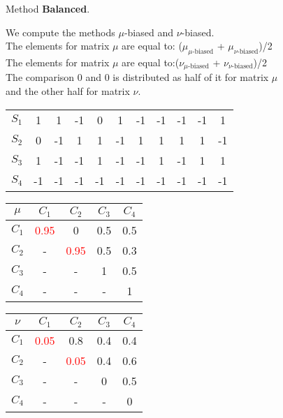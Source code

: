\documentclass{beamer}
\begin{document}
\begin{frame}
Method \textbf{Balanced}.

\bigskip
We compute the methods $\mu$-biased and $\nu$-biased.\\
The elements for matrix $\mu$ are equal to: ($\mu_{\text{$\mu$-biased}}$ + $\mu_{\text{$\nu$-biased}}$)/2\\
The elements for matrix $\mu$ are equal to:($\nu_{\text{$\mu$-biased}}$ + $\nu_{\text{$\nu$-biased}}$)/2\\
The comparison $0$ and $0$ is distributed as half of it for matrix $\mu$\\and the other half for matrix $\nu$.

\begin{center}
\begin{tabular}{c|cccccccccc}
& & & & & & & & & & \\
\hline $S_1$ & 1 & 1 & -1 & 0 & 1 & -1 & -1 & -1 & -1 & 1 \\
$S_2$ & 0 & -1 & 1 & 1 & -1 & 1 & 1 & 1 & 1 & -1 \\
$S_3$ & 1 & -1 & -1 & 1 & -1 & -1 & 1 & -1 & 1 & 1 \\
$S_4$ & -1 & -1 & -1 & -1 & -1 & -1 & -1 & -1 & -1 & -1
\end{tabular}
\end{center}

\begin{center}
\begin{minipage}[b]{0.4\linewidth}
\begin{tabular}{c|cccc}
$\mu$ & $C_1$ & $C_2$ & $C_3$ & $C_4$ \\
\hline $C_1$ & \textcolor{red}{0.95} & 0 & 0.5 & 0.5 \\
$C_2$ & - & \textcolor{red}{0.95} & 0.5 & 0.3 \\
$C_3$ & - & - & 1 & 0.5 \\
$C_4$ & - & - & - & 1
\end{tabular}
\end{minipage}
\begin{minipage}[b]{0.4\linewidth}
\begin{tabular}{c|cccc}
$\nu$ & $C_1$ & $C_2$ & $C_3$ & $C_4$ \\
\hline $C_1$ & \textcolor{red}{0.05} & 0.8 & 0.4 & 0.4 \\
$C_2$ & - & \textcolor{red}{0.05} & 0.4 & 0.6 \\
$C_3$ & - & - & 0 & 0.5 \\
$C_4$ & - & - & - & 0
\end{tabular}
\end{minipage}
\end{center}
\end{frame}
\end{document}
